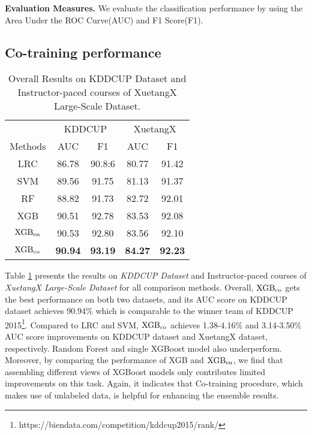 	\noindent \textbf{Evaluation Measures.} We evaluate the classification performance by using the Area Under the ROC Curve(AUC) and F1 Score(F1).
	
	\subsection{Co-training performance}
	
	\begin{table}
		\centering
		\caption{Overall Results on KDDCUP Dataset and Instructor-paced courses of XuetangX Large-Scale Dataset. }
		\begin{tabular}{c|cc|cc}
			\hline \hline
			              &\multicolumn{2}{c|}{KDDCUP} &\multicolumn{2}{c}{XuetangX}\\
			  Methods & AUC & F1 & AUC & F1  \\

			 \hline
			  LRC                      & 86.78 & 90.8:6   &  80.77 &91.42 \\
			 \hline
		     SVM                   &  89.56  & 91.75	   &   81.13  &91.37 \\
			\hline
			RF                       & 88.82  & 91.73  &82.72  &92.01 \\
			\hline
			 XGB 					&90.51 &92.78   & 83.53& 92.08\\
			\hline
			$\rm XGB_{en}$  &90.53  &92.80  & 83.56  &92.10\\
			\hline
		    $\rm XGB_{co}$ &\textbf{90.94} & \textbf{93.19} & \textbf{84.27}& \textbf{92.23} \\ 
			\hline	\hline
		\end{tabular}

		\label{tab:allRes}
	\end{table}
	

	Table \ref{tab:allRes} presents the results on \textit{KDDCUP Dataset} and Instructor-paced courses of \textit{XuetangX Large-Scale Dataset} for all comparison methods. Overall, $\rm XGB_{co}$ gets the best performance on both two datasets, and its AUC score on KDDCUP dataset achieves 90.94\%  which is comparable to the winner team of KDDCUP 2015\footnote{https://biendata.com/competition/kddcup2015/rank/}. Compared to LRC and SVM, $\rm XGB_{co}$ achieves 1.38-4.16\% and 3.14-3.50\% AUC score improvements on KDDCUP dataset and XuetangX dataset, respectively.
  Random Forest and single XGBoost model also underperform. Moreover, by comparing the performance of XGB and $\rm XGB_{en}$, we find that assembling different views of XGBoost models only contributes limited improvements on this task. Again, it indicates that Co-training procedure, which makes use of unlabeled data, is helpful for enhancing the ensemble results.
	
